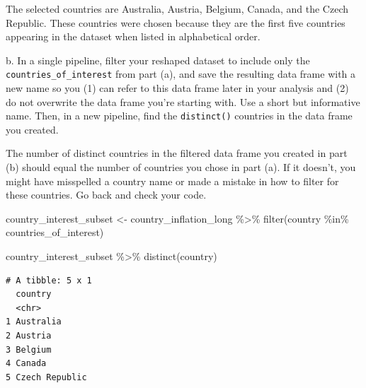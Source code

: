 \documentclass[
  letterpaper,
  DIV=11,
  numbers=noendperiod]{scrartcl}
\newenvironment{Shaded}{\begin{snugshade}}{\end{snugshade}}
\newcommand{\FunctionTok}[1]{\textcolor[rgb]{0.28,0.35,0.67}{#1}}
\newcommand{\NormalTok}[1]{\textcolor[rgb]{0.00,0.23,0.31}{#1}}
\newcommand{\OtherTok}[1]{\textcolor[rgb]{0.00,0.23,0.31}{#1}}
\newcommand{\SpecialCharTok}[1]{\textcolor[rgb]{0.37,0.37,0.37}{#1}}
\begin{document}
The selected countries are Australia, Austria, Belgium, Canada, and the
Czech Republic. These countries were chosen because they are the first
five countries appearing in the dataset when listed in alphabetical
order.

b. In a single pipeline, filter your reshaped dataset to include only
the \texttt{countries\_of\_interest} from part (a), and save the
resulting data frame with a new name so you (1) can refer to this data
frame later in your analysis and (2) do not overwrite the data frame
you're starting with. Use a short but informative name. Then, in a new
pipeline, find the \texttt{distinct()} countries in the data frame you
created.

\begin{tcolorbox}[enhanced jigsaw, toptitle=1mm, bottomrule=.15mm, colbacktitle=quarto-callout-tip-color!10!white, colframe=quarto-callout-tip-color-frame, leftrule=.75mm, breakable, toprule=.15mm, colback=white, arc=.35mm, coltitle=black, left=2mm, opacitybacktitle=0.6, bottomtitle=1mm, opacityback=0, title=\textcolor{quarto-callout-tip-color}{\faLightbulb}\hspace{0.5em}{Tip}, titlerule=0mm, rightrule=.15mm]

The number of distinct countries in the filtered data frame you created
in part (b) should equal the number of countries you chose in part (a).
If it doesn't, you might have misspelled a country name or made a
mistake in how to filter for these countries. Go back and check your
code.

\end{tcolorbox}

\begin{Shaded}
\begin{Highlighting}[]
\NormalTok{country\_interest\_subset }\OtherTok{\textless{}{-}}\NormalTok{ country\_inflation\_long }\SpecialCharTok{\%\textgreater{}\%}
  \FunctionTok{filter}\NormalTok{(country }\SpecialCharTok{\%in\%}\NormalTok{ countries\_of\_interest)}

\NormalTok{country\_interest\_subset }\SpecialCharTok{\%\textgreater{}\%}
  \FunctionTok{distinct}\NormalTok{(country)}
\end{Highlighting}
\end{Shaded}

\begin{verbatim}
# A tibble: 5 x 1
  country       
  <chr>         
1 Australia     
2 Austria       
3 Belgium       
4 Canada        
5 Czech Republic
\end{verbatim}
\end{document}
